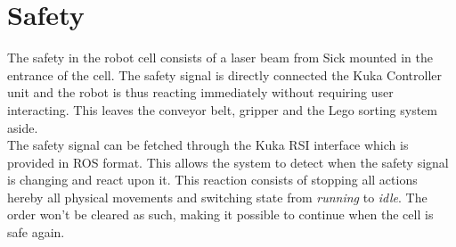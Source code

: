 \section{Safety} 
\label{sec:rc_safety}
The safety in the robot cell consists of a laser beam from Sick mounted in the entrance of the cell. The safety signal is directly connected the Kuka Controller unit and the robot is thus reacting immediately without requiring user interacting. This leaves the conveyor belt, gripper and the Lego sorting system aside. \\

The safety signal can be fetched through the Kuka RSI interface which is provided in ROS format. This allows the system to detect when the safety signal is changing and react upon it. This reaction consists of stopping all actions hereby all physical movements and switching state from \textit{running} to \textit{idle}. The order won't be cleared as such, making it possible to continue when the cell is safe again. \\


